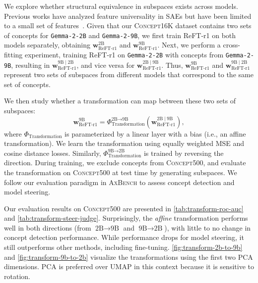 \documentclass{article}
\theoremstyle{plain}
\theoremstyle{definition}
\theoremstyle{remark}
\renewcommand{\cite}{\citep}
\newcommand{\shortbenchmark}{\textsc{AxBench}}
\begin{document}
We explore whether structural equivalence in subspaces exists across models. Previous works have analyzed feature universality in SAEs but have been limited to a small set of features~\cite{lan2024sparse}. Given that our \textsc{Concept16K} dataset contains two sets of concepts for \texttt{Gemma-2-2B} and \texttt{Gemma-2-9B}, we first train ReFT-r1 on both models separately, obtaining $\mathbf{w}_{\text{ReFT-r1}}^{\text{2B}}$ and $\mathbf{w}_{\text{ReFT-r1}}^{\text{9B}}$. Next, we perform a cross-fitting experiment, training ReFT-r1 on \texttt{Gemma-2-2B} with concepts from \texttt{Gemma-2-9B}, resulting in $\mathbf{w}_{\text{ReFT-r1}}^{\text{9B}\;\mid\;\text{2B}}$, and vice versa for $\mathbf{w}_{\text{ReFT-r1}}^{\text{2B}\;\mid\;\text{9B}}$. Thus, $\mathbf{w}_{\text{ReFT-r1}}^{\text{9B}}$ and $\mathbf{w}_{\text{ReFT-r1}}^{\text{9B}\;\mid\;\text{2B}}$ represent two sets of subspaces from different models that correspond to the same set of concepts. 

We then study whether a transformation can map between these two sets of subspaces:  
\[
\mathbf{w}_{\text{ReFT-r1}}^{\text{9B}} = \Phi_{\text{Transformation}}^{\text{2B}\rightarrow\text{9B}}(\mathbf{w}_{\text{ReFT-r1}}^{\text{2B}\;\mid\;\text{9B}}),
\]
where $\Phi_{\text{Transformation}}$ is parameterized by a linear layer with a bias (i.e., an affine transformation). We learn the transformation using equally weighted MSE and cosine distance losses. Similarly, $\Phi_{\text{Transformation}}^{\text{9B}\rightarrow\text{2B}}$ is trained by reversing the direction. During training, we exclude concepts from \textsc{Concept500}, and evaluate the transformation on \textsc{Concept500} at test time by generating subspaces. We follow our evaluation paradigm in \shortbenchmark{} to assess concept detection and model steering.

Our evaluation results on \textsc{Concept500} are presented in \cref{tab:transform-roc-auc} and \cref{tab:transform-steer-judge}. Surprisingly, the \emph{affine} transformation performs well in both directions (from $\text{2B}\rightarrow\text{9B}$ and $\text{9B}\rightarrow\text{2B}$), with little to no change in concept detection performance. While performance drops for model steering, it still outperforms other methods, including fine-tuning. \cref{fig:transform-2b-to-9b} and \cref{fig:transform-9b-to-2b} visualize the transformations using the first two PCA dimensions. PCA is preferred over UMAP in this context because it is sensitive to rotation.


\end{document}
